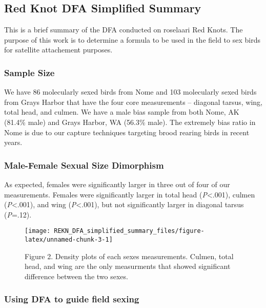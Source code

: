 \documentclass[
]{article}
\author{}
\date{\vspace{-2.5em}}
\begin{document}
\hypertarget{red-knot-dfa-simplified-summary}{%
\subsection{Red Knot DFA Simplified
Summary}\label{red-knot-dfa-simplified-summary}}

This is a brief summary of the DFA conducted on roselaari Red Knots. The
purpose of this work is to determine a formula to be used in the field
to sex birds for satellite attachement purposes.

\hypertarget{sample-size}{%
\subsubsection{Sample Size}\label{sample-size}}

We have 86 molecularly sexed birds from Nome and 103 molecularly sexed
birds from Grays Harbor that have the four core measurements -- diagonal
tarsus, wing, total head, and culmen. We have a male bias sample from
both Nome, AK (81.4\% male) and Grays Harbor, WA (56.3\% male). The
extremely bias ratio in Nome is due to our capture techniques targeting
brood rearing birds in recent years.

\hypertarget{male-female-sexual-size-dimorphism}{%
\subsubsection{Male-Female Sexual Size
Dimorphism}\label{male-female-sexual-size-dimorphism}}

As expected, females were significantly larger in three out of four of
our measurements. Females were significantly larger in total head
(\emph{P}\textless.001), culmen (\emph{P}\textless.001), and wing
(\emph{P}\textless.001), but not significantly larger in diagonal tarsus
(\emph{P}=.12).

\begin{figure}

{\centering \texttt{[image: REKN\_DFA\_simplified\_summary\_files/figure-latex/unnamed-chunk-3-1]} 

}

\caption{Figure 2. Density plots of each sexes measurements. Culmen, total head, and wing are the only measurments that showed significant difference between the two sexes.}\label{fig:unnamed-chunk-3}
\end{figure}

\hypertarget{using-dfa-to-guide-field-sexing}{%
\subsubsection{Using DFA to guide field
sexing}\label{using-dfa-to-guide-field-sexing}}
\end{document}
